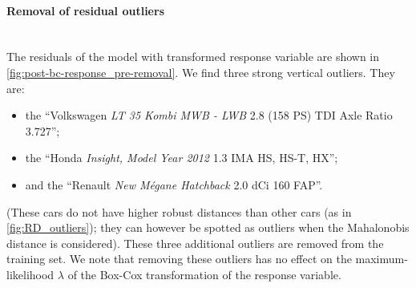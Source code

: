 \documentclass[a4paper, 12pt]{article}
\newcommand{\car}[3]{``#1 \textit{#2} #3''}
\begin{document}
\paragraph{Removal of residual outliers}\leavevmode\\
The residuals of the model with transformed response variable are shown in \cref{fig:post-bc-response_pre-removal}. We find three strong vertical outliers. They are:
\begin{itemize}[topsep=0pt,itemsep=0pt]
  \item the \car{Volkswagen}{LT 35 Kombi MWB - LWB}{2.8 (158 PS) TDI Axle Ratio 3.727};
  \item the \car{Honda}{Insight, Model Year 2012}{1.3 IMA HS, HS-T, HX};
  \item and the \car{Renault}{New M\'egane Hatchback}{2.0 dCi 160 FAP}.
\end{itemize}
(These cars do not have higher robust distances than other cars (as in \cref{fig:RD_outliers}); they can however be spotted as outliers when the Mahalonobis distance is considered). These three additional outliers are removed from the training set. We note that removing these outliers has no effect on the maximum-likelihood $\lambda$ of the Box-Cox transformation of the response variable.
\end{document}
